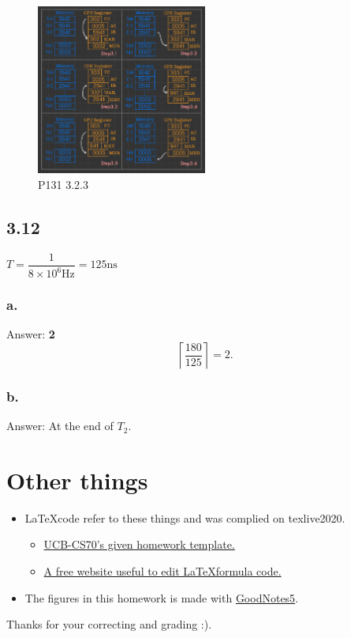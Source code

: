\documentclass[11pt]{article}  %
\begin{document}
\begin{figure}[H]
    \centering
    \includegraphics[width=0.5\textwidth]{pic/p2/p2-3.pdf}
    \caption{P131 3.2.3}
\end{figure}

\subsection*{3.12}
    $ T = \dfrac{1}{8\times 10^6\text{Hz}} = 125 \text{ns}$

\subsubsection*{a.}

    Answer: \textbf{2}
    $$
    \left \lceil \frac{180}{125}  \right \rceil = 2.
    $$

\subsubsection*{b.}

    Answer: At the end of $T_2$.

\section*{Other things}

\begin{itemize}
    \item \LaTeX \space code refer to these things and was complied on texlive2020. 
    \begin{itemize}
        \item  \href{https://www.eecs70.org/assets/misc/homework_template.tex}{UCB-CS70's given homework template.} 
        \item  \href{https://www.latexlive.com}{A free website useful to edit \LaTeX \space formula code.}
    \end{itemize}
    \item The figures in this homework is made with \href{https://apps.apple.com/us/app/goodnotes-5/id1444383602}{GoodNotes5}.
\end{itemize}

    Thanks for your correcting and grading :).
\end{document}
